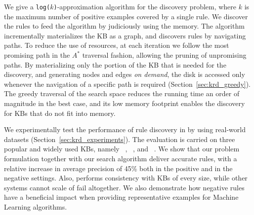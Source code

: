 \vspace{0.5ex}
We give a \texttt{log($k$)}-approximation algorithm for the discovery problem, %
where $k$ is the maximum number of positive examples covered by a single rule. We discover the rules to feed the algorithm by judiciously using the memory. The algorithm incrementally 
materializes the KB as a graph, and discovers rules by navigating paths. To reduce the use of resources, at each iteration we follow the most promising path in the $A^*$ traversal fashion, allowing the pruning of unpromising paths.	
By materializing only the portion of the KB that is needed for the discovery, and generating nodes and edges \emph{on demand}, the disk is accessed only whenever the navigation of a specific path is required (Section~\ref{sec:krd_greedy}). 
The greedy traversal of the search space reduces the running time an order of magnitude in the best case, and its low memory footprint enables the discovery for KBs that do not fit into memory.



\vspace{1ex}
We experimentally test the performance of rule discovery in \krd by using real-world datasets (Section~\ref{sec:krd_experiments}). The evaluation is carried on  three popular and widely used KBs, namely \dbpedia~\cite{bizer2009dbpedia}, \yago~\cite{suchanek2007yago}, and \wikidata~\cite{vrandevcic2014wikidata}. 
We show that our problem formulation together with our 
search algorithm deliver accurate rules, 
with a relative increase in average precision of 45\% both in the positive and in the negative settings.
Also, \krd performs consistency with KBs of every size, while other systems cannot scale of fail altogether. %
We also 
demonstrate how negative rules have a beneficial impact when providing representative examples for Machine Learning algorithms.




